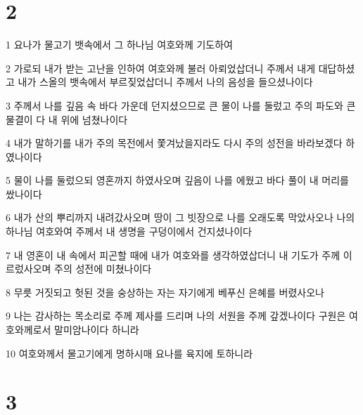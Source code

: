 \chapter{2}

\par 1 요나가 물고기 뱃속에서 그 하나님 여호와께 기도하여
\par 2 가로되 내가 받는 고난을 인하여 여호와께 불러 아뢰었삽더니 주께서 내게 대답하셨고 내가 스올의 뱃속에서 부르짖었삽더니 주께서 나의 음성을 들으셨나이다
\par 3 주께서 나를 깊음 속 바다 가운데 던지셨으므로 큰 물이 나를 둘렀고 주의 파도와 큰 물결이 다 내 위에 넘쳤나이다
\par 4 내가 말하기를 내가 주의 목전에서 쫓겨났을지라도 다시 주의 성전을 바라보겠다 하였나이다
\par 5 물이 나를 둘렀으되 영혼까지 하였사오며 깊음이 나를 에웠고 바다 풀이 내 머리를 쌌나이다
\par 6 내가 산의 뿌리까지 내려갔사오며 땅이 그 빗장으로 나를 오래도록 막았사오나 나의 하나님 여호와여 주께서 내 생명을 구덩이에서 건지셨나이다
\par 7 내 영혼이 내 속에서 피곤할 때에 내가 여호와를 생각하였삽더니 내 기도가 주께 이르렀사오며 주의 성전에 미쳤나이다
\par 8 무릇 거짓되고 헛된 것을 숭상하는 자는 자기에게 베푸신 은혜를 버렸사오나
\par 9 나는 감사하는 목소리로 주께 제사를 드리며 나의 서원을 주께 갚겠나이다 구원은 여호와께로서 말미암나이다 하니라
\par 10 여호와께서 물고기에게 명하시매 요나를 육지에 토하니라

\chapter{3}

